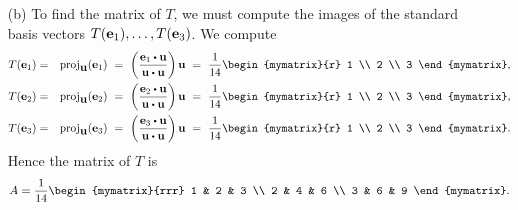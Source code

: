 \begin{solution}
\begin{enumerate}
  \item[(b)] To find the matrix of $T$, we must compute the images of
    the standard basis vectors $T(\mbox{\bf e}_1),\ldots,T(\mbox{\bf e}_3)$. We compute
    \begin{eqnarray*}
      T(\vect{e}_1)
      &=& \proj_{\vect{u}}(\vect{e}_1)
      ~=~ \paren{\frac{\vect{e}_1\dotprod \vect{u}}{\vect{u}\dotprod \vect{u}}}\vect{u}
      ~=~ \frac{1}{14}\begin{mymatrix}{r} 1 \\ 2 \\ 3 \end{mymatrix},\\
      T(\vect{e}_2)
      &=& \proj_{\vect{u}}(\vect{e}_2)
      ~=~ \paren{\frac{\vect{e}_2\dotprod \vect{u}}{\vect{u}\dotprod \vect{u}}}\vect{u}
      ~=~ \frac{1}{14}\begin{mymatrix}{r} 1 \\ 2 \\ 3 \end{mymatrix},\\
      T(\vect{e}_3)
      &=& \proj_{\vect{u}}(\vect{e}_3)
      ~=~ \paren{\frac{\vect{e}_3\dotprod \vect{u}}{\vect{u}\dotprod \vect{u}}}\vect{u}
      ~=~ \frac{1}{14}\begin{mymatrix}{r} 1 \\ 2 \\ 3 \end{mymatrix}.
    \end{eqnarray*}
    Hence the matrix of $T$ is
    \begin{equation*}
      A = \frac{1}{14}\begin{mymatrix}{rrr}
        1 & 2 & 3 \\
        2 & 4 & 6 \\
        3 & 6 & 9
      \end{mymatrix}.
    \end{equation*}
  \end{enumerate}
\end{solution}

